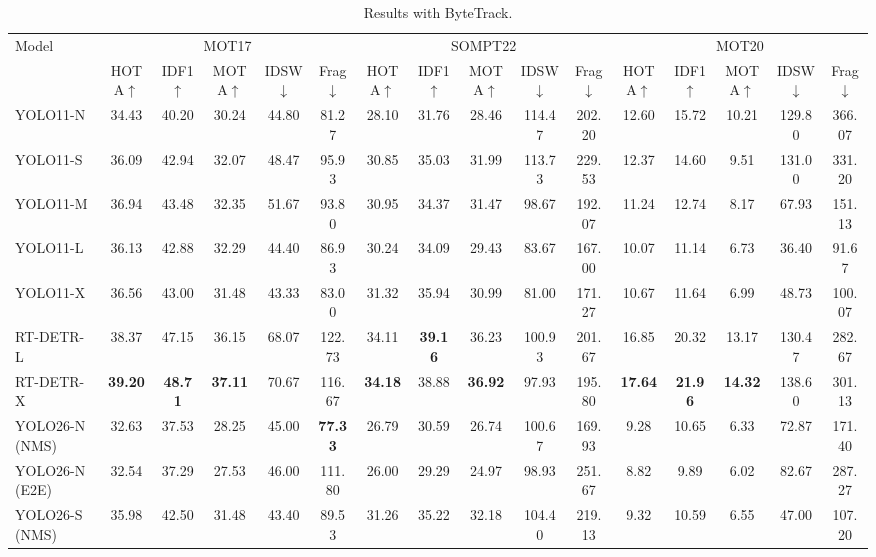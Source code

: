 \begin{table}[!thb]
\centering
\caption{Results with ByteTrack.}
\label{tab:quality_bytetrack}
\scriptsize
\setlength{\tabcolsep}{3pt}
\begin{tabular}{l *{15}{c}}
\toprule
\multirow{2}{*}{Model} & \multicolumn{5}{c}{MOT17} & \multicolumn{5}{c}{SOMPT22} & \multicolumn{5}{c}{MOT20} \\
\cmidrule(lr){2-6} \cmidrule(lr){7-11} \cmidrule(lr){12-16}
 & HOTA$\uparrow$ & IDF1$\uparrow$ & MOTA$\uparrow$ & IDSW$\downarrow$ & Frag$\downarrow$
 & HOTA$\uparrow$ & IDF1$\uparrow$ & MOTA$\uparrow$ & IDSW$\downarrow$ & Frag$\downarrow$
 & HOTA$\uparrow$ & IDF1$\uparrow$ & MOTA$\uparrow$ & IDSW$\downarrow$ & Frag$\downarrow$ \\
\midrule
YOLO11-N       & 34.43 & 40.20 & 30.24 & 44.80 &  81.27 & 28.10 & 31.76 & 28.46 & 114.47 & 202.20 & 12.60 & 15.72 & 10.21 & 129.80 & 366.07 \\
YOLO11-S       & 36.09 & 42.94 & 32.07 & 48.47 &  95.93 & 30.85 & 35.03 & 31.99 & 113.73 & 229.53 & 12.37 & 14.60 &  9.51 & 131.00 & 331.20 \\
YOLO11-M       & 36.94 & 43.48 & 32.35 & 51.67 &  93.80 & 30.95 & 34.37 & 31.47 &  98.67 & 192.07 & 11.24 & 12.74 &  8.17 &  67.93 & 151.13 \\
YOLO11-L       & 36.13 & 42.88 & 32.29 & 44.40 &  86.93 & 30.24 & 34.09 & 29.43 &  83.67 & 167.00 & 10.07 & 11.14 &  6.73 &  36.40 &  91.67 \\
YOLO11-X       & 36.56 & 43.00 & 31.48 & 43.33 &  83.00 & 31.32 & 35.94 & 30.99 &  81.00 & 171.27 & 10.67 & 11.64 &  6.99 &  48.73 & 100.07 \\
\midrule
RT-DETR-L      & 38.37 & 47.15 & 36.15 & 68.07 & 122.73 & 34.11 & \textbf{39.16} & 36.23 & 100.93 & 201.67 & 16.85 & 20.32 & 13.17 & 130.47 & 282.67 \\
RT-DETR-X      & \textbf{39.20} & \textbf{48.71} & \textbf{37.11} & 70.67 & 116.67 & \textbf{34.18} & 38.88 & \textbf{36.92} &  97.93 & 195.80 & \textbf{17.64} & \textbf{21.96} & \textbf{14.32} & 138.60 & 301.13 \\
\midrule
YOLO26-N (NMS) & 32.63 & 37.53 & 28.25 & 45.00 & \textbf{77.33} & 26.79 & 30.59 & 26.74 & 100.67 & 169.93 &  9.28 & 10.65 &  6.33 &  72.87 & 171.40 \\
YOLO26-N (E2E) & 32.54 & 37.29 & 27.53 & 46.00 & 111.80 & 26.00 & 29.29 & 24.97 &  98.93 & 251.67 &  8.82 &  9.89 &  6.02 &  82.67 & 287.27 \\
YOLO26-S (NMS) & 35.98 & 42.50 & 31.48 & 43.40 &  89.53 & 31.26 & 35.22 & 32.18 & 104.40 & 219.13 &  9.32 & 10.59 &  6.55 &  47.00 & 107.20 \\

\end{tabular}
\end{table}
